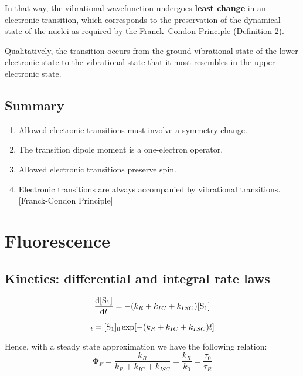 \documentclass[a4paper]{tufte-handout}
\theoremstyle{definition}
\begin{document}
In that way, the vibrational wavefunction undergoes \textbf{least change} in an electronic transition, 
which corresponds to the preservation of the dynamical state of the nuclei as required by the Franck–Condon Principle (Definition 2).

Qualitatively, the transition occurs from the ground vibrational state of the lower electronic state to the vibrational state 
that it most resembles in the upper electronic state.

\subsection{Summary}

\begin{enumerate}
  \item Allowed electronic transitions must involve a symmetry change.
  \item The transition dipole moment is a one-electron operator.
  \item Allowed electronic transitions preserve spin.
  \item Electronic transitions are always accompanied by vibrational transitions. [Franck-Condon Principle]
\end{enumerate}

\section{Fluorescence}

\subsection*{Kinetics: differential and integral rate laws}

\begin{equation}
  \frac{\mathrm{d}[\ce{S}_1]}{\mathrm{d}t} = -(k_R +k_{IC} +k_{ISC}) [\ce{S}_1]
\end{equation}

\begin{equation}
[\ce{S}_1]_t = [\ce{S}_1]_0 \exp[-(k_R + k_{IC} + k_{ISC})t]
\end{equation}

Hence, with a steady state approximation we have the following relation:
\begin{equation}\label{eq:1}
\mathbf{\Phi}_F = \frac{k_R}{k_R + k_{IC} + k_{ISC}} = \frac{k_R}{k_0} = \frac{\tau_0}{\tau_R}
\end{equation}
\end{document}
